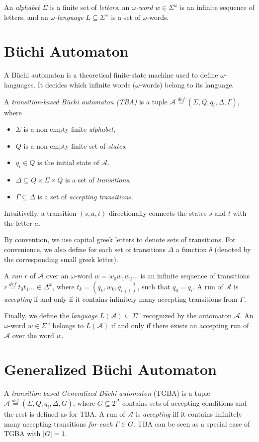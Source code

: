\documentclass[
	digital,
nolof, nolot
]{fithesis3}
\newcommand{\cA}{\mathcal{A}}
\newcommand{\lA}{L(\cA)}
\newcommand{\eqdef}{\overset{def}{=}}
\begin{document}
		
		An \emph{alphabet} $\Sigma$  is a finite set of \emph{letters}, an \emph{$\omega$-word} $w \in \Sigma^\omega$ is an infinite sequence of letters, and an \emph{$\omega$-language} $L \subseteq \Sigma^\omega$ is a set of $\omega$-words.
		\section{Büchi Automaton} \label{section:tba}
			A Büchi automaton is a theoretical finite-state machine used to define $\omega$-languages. It decides which infinite words ($\omega$-words) belong to its language.
			
			A \emph{transition-based Büchi automaton (TBA)} is a tuple $\cA\eqdef(\Sigma, Q, q_i, \Delta, \Gamma)$, where 
			\begin{itemize}
				\item $\Sigma$ is a non-empty finite \emph{alphabet},
				\item $Q$ is a non-empty finite set of \emph{states},
				\item $q_i \in Q$ is the initial state of $\cA$.
				\item $\Delta \subseteq Q \times \Sigma \times Q$ is a set of \emph{transitions}. 
				\item $\Gamma \subseteq \Delta$ is a set of \emph{accepting transitions}.
			\end{itemize}
			 Intuitivelly, a transition $(s, a, t)$  directionally connects the states $s$ and $t$ with the letter $a$.
			 
			 By convention, we use capital greek letters to denote sets of transitions. For convenience, we also define for each set of transitions $\Delta$ a function $\delta$ (denoted by the corresponding small greek letter). 
			 
			A \emph{run} $r$ of $\cA$ over an $\omega$-word $w=w_0w_1w_2\ldots$ is an infinite sequence of transitions
			$r\eqdef t_0t_1\ldots\in\Delta^\omega$, where $t_k=(q_k, w_k,q_{i+1})$,
			 such that $q_0=q_i$.
			A run of $\cA$ is \emph{accepting} if and only if it contains infinitely many accepting transitions from $\Gamma$.

			Finally, we define the \emph{language} $\lA \subseteq \Sigma^\omega$ recognized by the automaton $\cA$. An $\omega$-word $w \in \Sigma^\omega$ belongs to $\lA$ if and only if there exists an accepting run of $\cA$ over the word $w$. 
			
			
		\section{Generalized Büchi Automaton}
		A \emph{transition-based Generalized Büchi automaton} (TGBA) is a tuple $\cA\eqdef(\Sigma, Q, q_i, \Delta, G)$, where $G \subseteq 2^\Delta$ contains sets of accepting conditions and the rest is defined as for TBA. A run of $\cA$ is \emph{accepting} iff it contains infinitely many accepting transitions \emph{for each} $\Gamma \in G$. TBA can be seen as a special case of TGBA with $|G|=1$.
		
\end{document}
